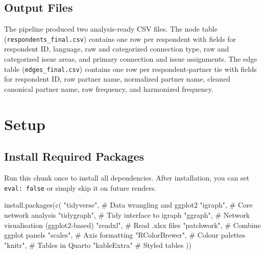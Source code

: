 \documentclass[
  letterpaper,
  DIV=11,
  numbers=noendperiod]{scrartcl}
\newenvironment{Shaded}{\begin{snugshade}}{\end{snugshade}}
\newcommand{\CommentTok}[1]{\textcolor[rgb]{0.37,0.37,0.37}{#1}}
\newcommand{\FunctionTok}[1]{\textcolor[rgb]{0.28,0.35,0.67}{#1}}
\newcommand{\NormalTok}[1]{\textcolor[rgb]{0.00,0.23,0.31}{#1}}
\newcommand{\StringTok}[1]{\textcolor[rgb]{0.13,0.47,0.30}{#1}}
\begin{document}
\subsection{Output Files}\label{output-files}

The pipeline produced two analysis-ready CSV files. The node table
(\texttt{respondents\_final.csv}) contains one row per respondent with
fields for respondent ID, language, raw and categorized connection type,
raw and categorized issue areas, and primary connection and issue
assignments. The edge table (\texttt{edges\_final.csv}) contains one row
per respondent-partner tie with fields for respondent ID, raw partner
name, normalized partner name, cleaned canonical partner name, raw
frequency, and harmonized frequency.

\section{Setup}\label{setup}

\subsection{Install Required Packages}\label{install-required-packages}

Run this chunk once to install all dependencies. After installation, you
can set \texttt{eval:\ false} or simply skip it on future renders.

\begin{Shaded}
\begin{Highlighting}[]
\FunctionTok{install.packages}\NormalTok{(}\FunctionTok{c}\NormalTok{(}
  \StringTok{"tidyverse"}\NormalTok{,      }\CommentTok{\# Data wrangling and ggplot2}
  \StringTok{"igraph"}\NormalTok{,         }\CommentTok{\# Core network analysis}
  \StringTok{"tidygraph"}\NormalTok{,      }\CommentTok{\# Tidy interface to igraph}
  \StringTok{"ggraph"}\NormalTok{,         }\CommentTok{\# Network visualisation (ggplot2{-}based)}
  \StringTok{"readxl"}\NormalTok{,         }\CommentTok{\# Read .xlsx files}
  \StringTok{"patchwork"}\NormalTok{,      }\CommentTok{\# Combine ggplot panels}
  \StringTok{"scales"}\NormalTok{,         }\CommentTok{\# Axis formatting}
  \StringTok{"RColorBrewer"}\NormalTok{,   }\CommentTok{\# Colour palettes}
  \StringTok{"knitr"}\NormalTok{,          }\CommentTok{\# Tables in Quarto}
  \StringTok{"kableExtra"}      \CommentTok{\# Styled tables}
\NormalTok{))}
\end{Highlighting}
\end{Shaded}
\end{document}
